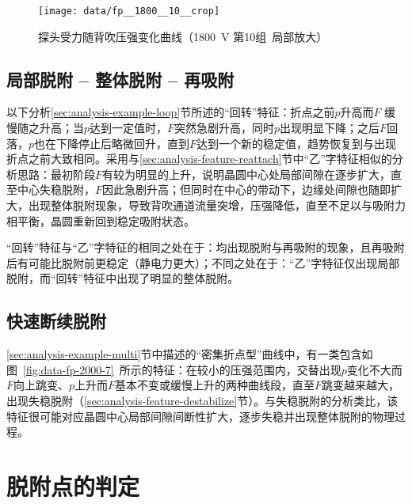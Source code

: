 \begin{figure}[thbp]
\centering
\texttt{[image: data/fp\_\_1800\_\_10\_\_crop]}
\caption{探头受力随背吹压强变化曲线（\SI{1800}{\V} 第10组\ 局部放大）}
\label{fig:data-fp-1800-10-crop}
\end{figure}


\subsection{局部脱附 -- 整体脱附 -- 再吸附}\label{sec:analysis-feature-loop}

以下分析\ref{sec:analysis-example-loop}节所述的“回转”特征：折点之前$p$升高而$F$ 缓慢随之升高；当$p$达到一定值时，$F$突然急剧升高，同时$p$出现明显下降；之后$F$回落，$p$也在下降停止后略微回升，直到$F$达到一个新的稳定值，趋势恢复到与出现折点之前大致相同。采用与\ref{sec:analysis-feature-reattach}节中“乙”字特征相似的分析思路：最初阶段$F$有较为明显的上升，说明晶圆中心处局部间隙在逐步扩大，直至中心失稳脱附，$F$因此急剧升高；但同时在中心的带动下，边缘处间隙也随即扩大，出现整体脱附现象，导致背吹通道流量突增，压强降低，直至不足以与吸附力相平衡，晶圆重新回到稳定吸附状态。

“回转”特征与“乙”字特征的相同之处在于：均出现脱附与再吸附的现象，且再吸附后有可能比脱附前更稳定（静电力更大）；不同之处在于：“乙”字特征仅出现局部脱附，而“回转”特征中出现了明显的整体脱附。


\subsection{快速断续脱附}\label{sec:analysis-feature-multi}

\ref{sec:analysis-example-multi}节中描述的“密集折点型”曲线中，有一类包含如图~\ref{fig:data-fp-2000-7}~所示的特征：在较小的压强范围内，交替出现$p$变化不大而$F$向上跳变、$p$上升而$F$基本不变或缓慢上升的两种曲线段，直至$F$跳变越来越大，出现失稳脱附（\ref{sec:analysis-feature-destabilize}节）。与失稳脱附的分析类比，该特征很可能对应晶圆中心局部间隙间断性扩大，逐步失稳并出现整体脱附的物理过程。










\section{脱附点的判定}\label{sec:analysis-criterion}

